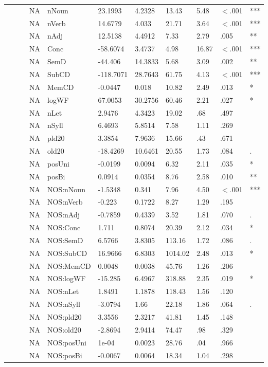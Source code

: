 \begin{table}[ht]
\begin{tabular}{lllllllllll}
   &  &  & NA & nNoun & 23.1993 & 4.2328 & 13.43 & 5.48 & $<$.001 & *** \\ 
   &  &  & NA & nVerb & 14.6779 & 4.033 & 21.71 & 3.64 & $<$.001 & *** \\ 
   &  &  & NA & nAdj & 12.5138 & 4.4912 & 7.33 & 2.79 & .005 & ** \\ 
   &  &  & NA & Conc & -58.6074 & 3.4737 & 4.98 & 16.87 & $<$.001 & *** \\ 
   &  &  & NA & SemD & -44.406 & 14.3833 & 5.68 & 3.09 & .002 & ** \\ 
   &  &  & NA & SubCD & -118.7071 & 28.7643 & 61.75 & 4.13 & $<$.001 & *** \\ 
   &  &  & NA & MemCD & -0.0447 & 0.018 & 10.82 & 2.49 & .013 & * \\ 
   &  &  & NA & logWF & 67.0053 & 30.2756 & 60.46 & 2.21 & .027 & * \\ 
   &  &  & NA & nLet & 2.9476 & 4.3423 & 19.02 & .68 & .497 &   \\ 
   &  &  & NA & nSyll & 6.4693 & 5.8514 & 7.58 & 1.11 & .269 &   \\ 
   &  &  & NA & pld20 & 3.3854 & 7.9636 & 15.66 & .43 & .671 &   \\ 
   &  &  & NA & old20 & -18.4269 & 10.6461 & 20.55 & 1.73 & .084 & . \\ 
   &  &  & NA & posUni & -0.0199 & 0.0094 & 6.32 & 2.11 & .035 & * \\ 
   &  &  & NA & posBi & 0.0914 & 0.0354 & 8.76 & 2.58 & .010 & ** \\ 
   &  &  & NA & NOS:nNoun & -1.5348 & 0.341 & 7.96 & 4.50 & $<$.001 & *** \\ 
   &  &  & NA & NOS:nVerb & -0.223 & 0.1722 & 8.27 & 1.29 & .195 &   \\ 
   &  &  & NA & NOS:nAdj & -0.7859 & 0.4339 & 3.52 & 1.81 & .070 & . \\ 
   &  &  & NA & NOS:Conc & 1.711 & 0.8074 & 20.39 & 2.12 & .034 & * \\ 
   &  &  & NA & NOS:SemD & 6.5766 & 3.8305 & 113.16 & 1.72 & .086 & . \\ 
   &  &  & NA & NOS:SubCD & 16.9666 & 6.8303 & 1014.02 & 2.48 & .013 & * \\ 
   &  &  & NA & NOS:MemCD & 0.0048 & 0.0038 & 45.76 & 1.26 & .206 &   \\ 
   &  &  & NA & NOS:logWF & -15.285 & 6.4967 & 318.88 & 2.35 & .019 & * \\ 
   &  &  & NA & NOS:nLet & 1.8491 & 1.1878 & 118.43 & 1.56 & .120 &   \\ 
   &  &  & NA & NOS:nSyll & -3.0794 & 1.66 & 22.18 & 1.86 & .064 & . \\ 
   &  &  & NA & NOS:pld20 & 3.3556 & 2.3217 & 41.81 & 1.45 & .148 &   \\ 
   &  &  & NA & NOS:old20 & -2.8694 & 2.9414 & 74.47 & .98 & .329 &   \\ 
   &  &  & NA & NOS:posUni & 1e-04 & 0.0023 & 28.76 & .04 & .966 &   \\ 
   &  &  & NA & NOS:posBi & -0.0067 & 0.0064 & 18.34 & 1.04 & .298 &   \\ 
   \hline
\end{tabular}
\endgroup
\end{table}
